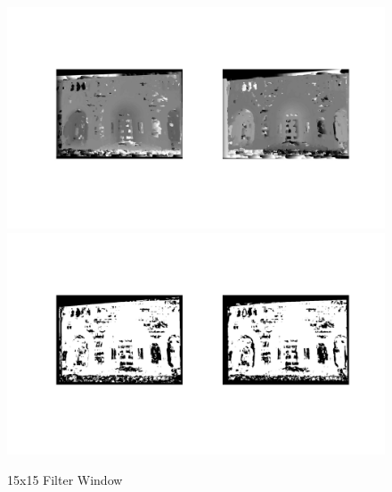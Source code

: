 \documentclass[12pt]{article}
\begin{document}
\begin{figure}[H]
	\centering
	\includegraphics[width=1.1\textwidth]{dc15_1.jpg}
	\includegraphics[width=1.1\textwidth]{dc15_2.jpg}
	\caption{15x15 Filter Window}
	\label{fig1}
\end{figure}
\vspace{5mm}
\end{document}

